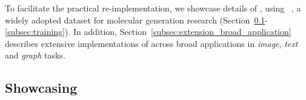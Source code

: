 

% 
To facilitate the practical re-implementation, we showcase details of \pipeline, using \olddataset~\cite{EZJ21}, a widely adopted dataset for molecular generation research (Section~\ref{subsec:preliminary}-\ref{subsec:training}). 
% 
In addition, Section~\ref{subsec:extension_broad_application} describes extensive implementations of \pipeline across broad applications in \emph{image}, \emph{text} and \emph{graph} tasks. 

\subsection{Showcasing \olddataset}
\label{subsec:preliminary}


